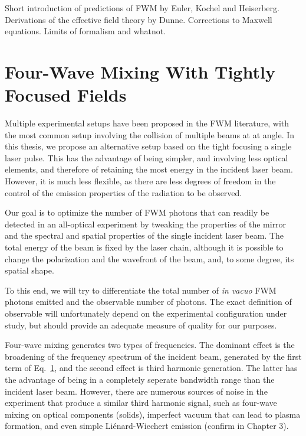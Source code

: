 \documentclass[11pt,SymmetricalJury]{inrsthesis/inrsthesis}
\begin{document}
Short introduction of predictions of FWM by Euler, Kochel and Heiserberg.
Derivations of the effective field theory by Dunne. Corrections to Maxwell
equations. Limits of formalism and whatnot.


\section{Four-Wave Mixing With Tightly Focused Fields}

Multiple experimental setups have been proposed in the FWM literature, with
the most common setup involving the collision of multiple beams at at angle.
In this thesis, we propose an alternative setup based on the tight focusing
a single laser pulse. This has the advantage of being simpler, and involving
less optical elements, and therefore of retaining the most energy in the
incident laser beam. However, it is much less flexible, as there are less
degrees of freedom in the control of the emission properties of the radiation
to be observed.

Our goal is to optimize the number of FWM photons that can readily be detected
in an all-optical experiment by tweaking the properties of the mirror and the
spectral and spatial properties of the single incident laser beam. The total
energy of the beam is fixed by the laser chain, although it is possible to change
the polarization and the wavefront of the beam, and, to some degree, its spatial
shape.

To this end, we will try to differentiate the total number of \textit{in vacuo}
FWM photons emitted and the observable number of photons. The exact definition
of observable will unfortunately depend on the experimental configuration
under study, but should provide an adequate measure of quality for our
purposes.

Four-wave mixing generates two types of frequencies. The dominant effect
is the broadening of the frequency spectrum of the incident beam, generated
by the first term of Eq.~\ref{}, and the second effect is third harmonic generation.
The latter has the advantage of being in a completely seperate bandwidth range
than the incident laser beam. However, there are numerous sources of noise in the
experiment that produce a similar third harmonic signal, such as four-wave mixing
on optical components (solids), imperfect vacuum that can lead to plasma formation,
and even simple Liénard-Wiechert emission (confirm in Chapter 3).
\end{document}
